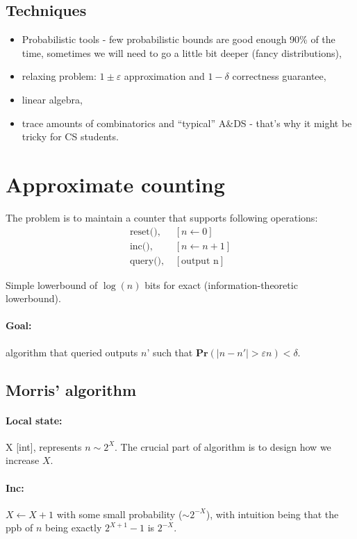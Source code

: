 \documentclass[11pt]{article}
\newcommand{\Ppb}{\mathbf{Pr}}
\begin{document}
\subsection{Techniques}
\begin{itemize}
    \item Probabilistic tools  - few probabilistic bounds are good enough 90\% of the time, sometimes we will need to go a little bit deeper (fancy distributions),
    \item relaxing problem: $1\pm \varepsilon$ approximation and $1-\delta$ correctness guarantee,
    \item linear algebra,
    \item trace amounts of combinatorics and ``typical'' A\&DS - that's why it might be tricky for CS students.
\end{itemize}
\section{Approximate counting} 
The problem is to maintain a counter that supports following operations:
\begin{align*}
\text{reset(),  } &[n\leftarrow 0]\\
\text{inc(),    } &[n\leftarrow n+1]\\
\text{query(),  } &[\text{output n}]
\end{align*}

Simple lowerbound of $\log(n)$ bits for exact (information-theoretic lowerbound).

\paragraph{Goal:} algorithm that queried outputs $n’$ such that $\Ppb( |n-n'| > \varepsilon n ) < \delta$.
\subsection{Morris’ algorithm \cite{DBLP:journals/cacm/Morris78a}}
\paragraph{Local state:} X [int], represents $n \sim 2^X$. The crucial part of algorithm is to design how we increase $X$.

\paragraph{Inc: }$X \leftarrow X+1$ with some small probability ($\sim 2^{-X}$), with intuition being that the ppb of $n$ being exactly $2^{X+1}-1$ is $2^{-X}$.
\end{document}
